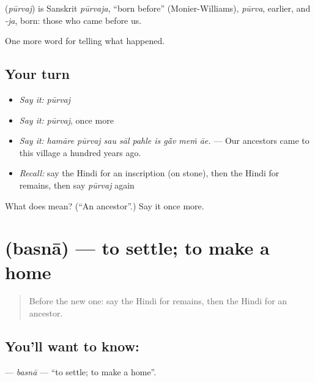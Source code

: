 \begin{cousinweb}
\textbf{} (\emph{pūrvaj}) is Sanskrit \emph{pūrvaja}, \textquotedblleft{}born before\textquotedblright{} (Monier-Williams), \emph{pūrva}, earlier, and \emph{-ja}, born: those who came before us.
\end{cousinweb}

\begin{grammarlens}[title={What you've built}]
One more word for telling what happened.
\end{grammarlens}

\subsection*{Your turn}
\begin{itemize}
\raggedright
  \item \emph{Say it:} \emph{pūrvaj}
  \item \emph{Say it:} \emph{pūrvaj}, once more
  \item \emph{Say it:} \emph{hamāre pūrvaj sau sāl pahle is gā̃v meṁ āe.} — Our ancestors came to this village a hundred years ago.
  \item \emph{Recall:} say the Hindi for an inscription (on stone), then the Hindi for remains, then say \emph{pūrvaj} again
\end{itemize}

\begin{tcolorbox}[breakable,colback=teal!4,colframe=teal!35!black,title={Before you move on}]
What does  mean? (\textquotedblleft{}An ancestor\textquotedblright{}.) Say it once more.
\end{tcolorbox}
\section[\texorpdfstring{\hi{बसना} (basnā)}{बसना (basnā)}]{ (basnā) — to settle; to make a home}

\label{lesson:HI-C327-basna}



\begin{quote}
Before the new one: say the Hindi for remains, then the Hindi for an ancestor.
\end{quote}

\subsection*{You'll want to know: }
\textbf{} — \emph{basnā} — \textquotedblleft{}to settle; to make a home\textquotedblright{}.

